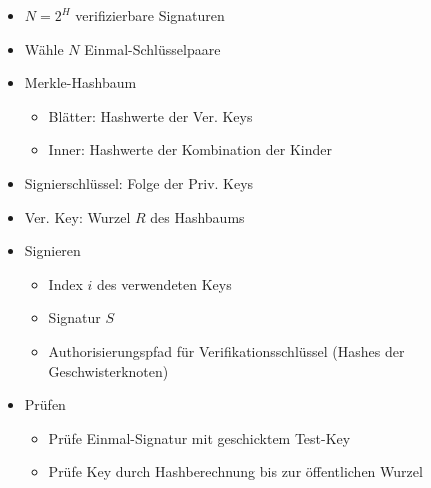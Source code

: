 \documentclass[11pt, paper=a4, twocolumn]{scrartcl}
\begin{document}
\begin{itemize}
\begin{itemize}
					\item $N=2^H$ verifizierbare Signaturen
					\item Wähle $N$ Einmal-Schlüsselpaare
					\item Merkle-Hashbaum
						\begin{itemize}
							\item Blätter: Hashwerte der Ver. Keys
							\item Inner: Hashwerte der Kombination der Kinder
						\end{itemize}
					\item Signierschlüssel: Folge der Priv. Keys
					\item Ver. Key: Wurzel $R$ des Hashbaums
					\item Signieren
						\begin{itemize}
							\item Index $i$ des verwendeten Keys
							\item Signatur $S$
							\item Authorisierungspfad für Verifikationsschlüssel (Hashes der Geschwisterknoten)
						\end{itemize}
					\item Prüfen
						\begin{itemize}
							\item Prüfe Einmal-Signatur mit geschicktem Test-Key
							\item Prüfe Key durch Hashberechnung bis zur öffentlichen Wurzel
						\end{itemize}
				\end{itemize}
		\end{itemize}
	
\end{document}
